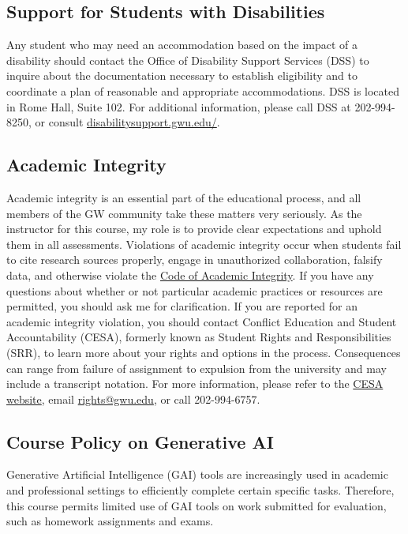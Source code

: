 \documentclass[12pt,letterpaper]{article}
\begin{document}
\subsection*{Support for Students with Disabilities}

Any student who may need an accommodation based on the impact of a disability should contact the Office of Disability Support Services (DSS) to inquire about the documentation necessary to establish eligibility and to coordinate a plan of reasonable and appropriate accommodations. DSS is located in Rome Hall, Suite 102. For additional information, please call DSS at 202-994-8250, or consult \href{https://disabilitysupport.gwu.edu/}{disabilitysupport.gwu.edu/}.

\subsection*{Academic Integrity}

Academic integrity is an essential part of the educational process, and all members of the GW community take these matters very seriously. As the instructor for this course, my role is to provide clear expectations and uphold them in all assessments. Violations of academic integrity occur when students fail to cite research sources properly, engage in unauthorized collaboration, falsify data, and otherwise violate the \href{https://students.gwu.edu/code-academic-integrity}{Code of Academic Integrity}. If you have any questions about whether or not particular academic practices or resources are permitted, you should ask me for clarification. If you are reported for an academic integrity violation, you should contact Conflict Education and Student Accountability (CESA), formerly known as Student Rights and Responsibilities (SRR), to learn more about your rights and options in the process. Consequences can range from failure of assignment to expulsion from the university and may include a transcript notation. For more information, please refer to the \href{https://studentconduct.gwu.edu/academic-integrity}{CESA website}, email \href{mailto:cesa@gwu.edu}{rights@gwu.edu}, or call 202-994-6757. 

\subsection*{Course Policy on Generative AI}

Generative Artificial Intelligence (GAI) tools are increasingly used in academic and professional settings to efficiently complete certain specific tasks. Therefore, this course permits limited use of GAI tools on work submitted for evaluation, such as homework assignments and exams.
\end{document}
